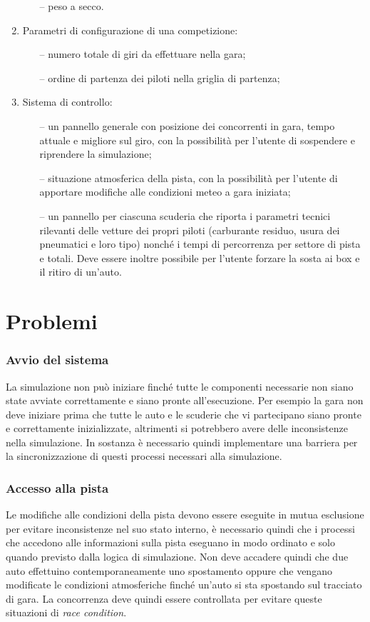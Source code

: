 \documentclass[11pt,a4paper]{report}
\begin{document}
\begin{enumerate}
\begin{itemize}
	\item[--] peso a secco.
	\end{itemize}
\item Parametri di configurazione di una competizione:
	\begin{itemize}
	\item[--] numero totale di giri da effettuare nella gara;
	\item[--] ordine di partenza dei piloti nella griglia di partenza;
	\end{itemize}
\item Sistema di controllo:
	\begin{itemize}
	\item[--] un pannello generale con posizione dei concorrenti in gara, tempo attuale e migliore sul giro, con la possibilità per l'utente di sospendere e riprendere la simulazione;
	\item[--] situazione atmosferica della pista, con la possibilità per l'utente di apportare modifiche alle condizioni meteo a gara iniziata;
	\item[--] un pannello per ciascuna scuderia che riporta i parametri tecnici rilevanti delle vetture dei propri piloti (carburante residuo, usura dei pneumatici e loro tipo) nonché i tempi di percorrenza per settore di pista e totali. Deve essere inoltre possibile per l'utente forzare la sosta ai box e il ritiro di un'auto.
	\end{itemize}
\end{enumerate}


\chapter{Problemi}
\subsection*{Avvio del sistema}
La simulazione non può iniziare finché tutte le componenti necessarie non siano state avviate correttamente e siano pronte all'esecuzione. Per esempio la gara non deve iniziare prima che tutte le auto e le scuderie che vi partecipano siano pronte e correttamente inizializzate, altrimenti si potrebbero avere delle inconsistenze nella simulazione. In sostanza è necessario quindi implementare una barriera per la sincronizzazione di questi processi necessari alla simulazione.

\subsection*{Accesso alla pista}
Le modifiche alle condizioni della pista devono essere eseguite in mutua esclusione per evitare inconsistenze nel suo stato interno, è necessario quindi che i processi che accedono alle informazioni sulla pista eseguano in modo ordinato e solo quando previsto dalla logica di simulazione. Non deve accadere quindi che due auto effettuino contemporaneamente uno spostamento oppure che vengano modificate le condizioni atmosferiche finché un'auto si sta spostando sul tracciato di gara.
La concorrenza deve quindi essere controllata per evitare queste situazioni di \textit{race condition}.
\end{document}
